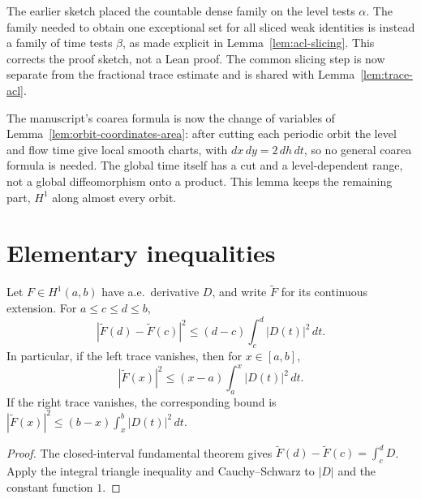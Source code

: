 \begin{remark}
The earlier sketch placed the countable dense family on the level tests
$\alpha$. The family needed to obtain one exceptional set for all sliced
weak identities is instead a family of time tests $\beta$, as made explicit
in Lemma~\ref{lem:acl-slicing}. This corrects the proof sketch, not a Lean
proof. The common slicing step is now separate from the fractional trace
estimate and is shared with Lemma~\ref{lem:trace-acl}.
\end{remark}

\begin{remark}
The manuscript's coarea formula is now the change of variables of
Lemma~\ref{lem:orbit-coordinates-area}: after cutting each periodic orbit the level and
flow time give local smooth charts, with $dx\,dy=2\,dh\,dt$, so no general coarea formula
is needed. The global time itself has a cut and a level-dependent range, not a global
diffeomorphism onto a product. This lemma keeps the remaining part, $H^1$ along almost
every orbit.
\end{remark}

\section{Elementary inequalities}

\begin{lemma}
\label{lem:h1-endpoint-estimates}
\leanok
Let $F\in H^1(a,b)$ have a.e.\ derivative $D$, and write $\widetilde F$ for
its continuous extension. For $a\le c\le d\le b$,
\[
  |\widetilde F(d)-\widetilde F(c)|^2
  \le (d-c)\int_c^d|D(t)|^2\,dt.
\]
In particular, if the left trace vanishes, then for $x\in[a,b]$,
\[
  |\widetilde F(x)|^2\le(x-a)\int_a^x|D(t)|^2\,dt.
\]
If the right trace vanishes, the corresponding bound is
$|\widetilde F(x)|^2\le(b-x)\int_x^b|D(t)|^2\,dt$.
\end{lemma}

\begin{proof}
\leanok
The closed-interval fundamental theorem gives
$\widetilde F(d)-\widetilde F(c)=\int_c^dD$. Apply the integral triangle
inequality and Cauchy--Schwarz to $|D|$ and the constant function $1$.
\end{proof}


